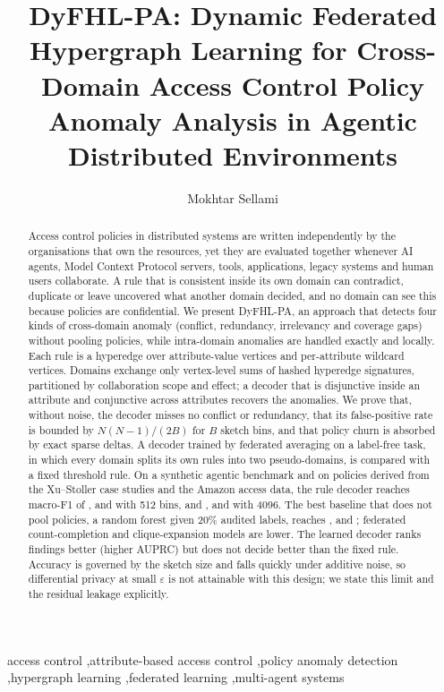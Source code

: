 \documentclass[preprint,12pt]{elsarticle}
\theoremstyle{definition}
\newcommand{\name}{DyFHL-PA\xspace}
\begin{document}
\begin{frontmatter}

\title{DyFHL-PA: Dynamic Federated Hypergraph Learning for Cross-Domain Access Control Policy Anomaly Analysis in Agentic Distributed Environments}

\author[riadi]{Mokhtar Sellami}
\address[riadi]{RIADI Laboratory, National School of Computer Science (ENSI), University of Manouba, Manouba, Tunisia}

\begin{abstract}
Access control policies in distributed systems are written independently by the organisations that own the resources, yet they are evaluated together whenever AI agents, Model Context Protocol servers, tools, applications, legacy systems and human users collaborate. A rule that is consistent inside its own domain can contradict, duplicate or leave uncovered what another domain decided, and no domain can see this because policies are confidential. We present \name, an approach that detects four kinds of cross-domain anomaly (conflict, redundancy, irrelevancy and coverage gaps) without pooling policies, while intra-domain anomalies are handled exactly and locally. Each rule is a hyperedge over attribute-value vertices and per-attribute wildcard vertices. Domains exchange only vertex-level sums of hashed hyperedge signatures, partitioned by collaboration scope and effect; a decoder that is disjunctive inside an attribute and conjunctive across attributes recovers the anomalies. We prove that, without noise, the decoder misses no conflict or redundancy, that its false-positive rate is bounded by $N(N-1)/(2B)$ for $B$ sketch bins, and that policy churn is absorbed by exact sparse deltas. A decoder trained by federated averaging on a label-free task, in which every domain splits its own rules into two pseudo-domains, is compared with a fixed threshold rule. On a synthetic agentic benchmark and on policies derived from the Xu--Stoller case studies and the Amazon access data, the rule decoder reaches macro-F1 of \mainagenticR, \mainxustollerR{} and \mainamazonR{} with 512 bins, and \skagenticruleBmmmmxcvi, \skxustollerruleBmmmmxcvi{} and \skamazonruleBmmmmxcvi{} with 4096. The best baseline that does not pool policies, a random forest given 20\% audited labels, reaches \mainagenticbest, \mainxustollerbest{} and \mainamazonbest; federated count-completion and clique-expansion models are lower. The learned decoder ranks findings better (higher AUPRC) but does not decide better than the fixed rule. Accuracy is governed by the sketch size and falls quickly under additive noise, so differential privacy at small $\varepsilon$ is not attainable with this design; we state this limit and the residual leakage explicitly.
\end{abstract}


\begin{keyword}
access control \sep attribute-based access control \sep policy anomaly detection \sep hypergraph learning \sep federated learning \sep multi-agent systems
\end{keyword}
\end{frontmatter}
\end{document}
